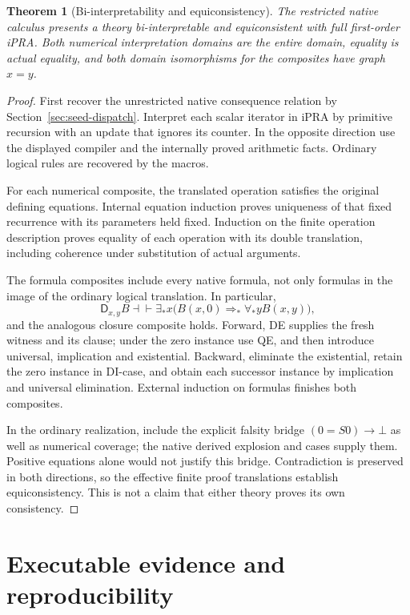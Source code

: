 \documentclass[11pt,letterpaper]{article}
\newtheorem{theorem}{Theorem}[section]
\theoremstyle{definition}\newtheorem{definition}[theorem]{Definition}
\theoremstyle{remark}\newtheorem{remark}[theorem]{Remark}
\newcommand{\D}{\mathsf D}
\begin{document}
\begin{theorem}[Bi-interpretability and equiconsistency]
The restricted native calculus presents a theory bi-interpretable and
equiconsistent with full first-order iPRA. Both numerical interpretation
domains are the entire domain, equality is actual equality, and both
domain isomorphisms for the composites have graph $x=y$.
\end{theorem}
\begin{proof}
First recover the unrestricted native consequence relation by
Section~\ref{sec:seed-dispatch}. Interpret each scalar iterator in iPRA
by primitive recursion with an update that ignores its counter. In the
opposite direction use the displayed compiler and the internally proved
arithmetic facts. Ordinary logical rules are recovered by the macros.

For each numerical composite, the translated operation satisfies the
original defining equations. Internal equation induction proves
uniqueness of that fixed recurrence with its parameters held fixed.
Induction on the finite operation description proves equality of each
operation with its double translation, including coherence under
substitution of actual arguments.

The formula composites include every native formula, not only formulas
in the image of the ordinary logical translation. In particular,
\[
 \D_{x,y}B\dashv\vdash
 \exists_*x\bigl(B(x,0)\Rightarrow_*\forall_*yB(x,y)\bigr),
\]
and the analogous closure composite holds. Forward, DE supplies the
fresh witness and its clause; under the zero instance use QE, and then
introduce universal, implication and existential. Backward, eliminate
the existential, retain the zero instance in DI-case, and obtain each
successor instance by implication and universal elimination. External
induction on formulas finishes both composites.

In the ordinary realization, include the explicit falsity bridge
$(0=S0)\to\bot$ as well as numerical coverage; the native derived
explosion and cases supply them. Positive equations alone would not
justify this bridge. Contradiction is preserved in both directions, so
the effective finite proof translations establish equiconsistency.
This is not a claim that either theory proves its own consistency.
\end{proof}



\section{Executable evidence and reproducibility}
\label{sec:evidence}
\end{document}
